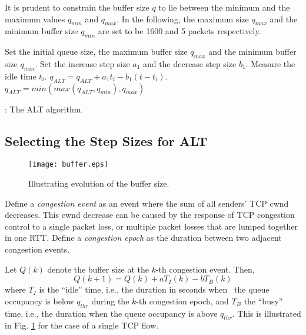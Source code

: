 \documentclass[10pt,twocolumn, journal]{IEEEtran}
\def\DLaddition#1{\noindent\ {\color{black} #1}}
\begin{document}
It is prudent to constrain the buffer size $q$ to lie between the minimum and the maximum values $q_{min}$ and $q_{max}$.  In the following, the maximum size $q_{max}$ and the minimum buffer size $q_{min}$ are set to be 1600 and 5 packets respectively.   


\begin{algorithm}[tb]
    \begin{algorithmic}[1]
        \STATE Set the initial queue size, the maximum buffer size $q_{max}$ and
            the minimum buffer size $q_{min}$.
        \STATE Set the increase step size $a_1$ and the decrease step size $b_1$.
            \STATE Measure the idle time $t_i$.
            \STATE $q_{ALT}=q_{ALT}+a_1t_i-b_1(t-t_i)$.
            \STATE $q_{ALT} = min(max(q_{ALT}, q_{min}), q_{max})$ 
       \ENDFOR
    \end{algorithmic}
    \caption{: The ALT algorithm.}
    \label{algo_alt}
\end{algorithm}



\subsection{Selecting the Step Sizes for ALT}\label{sec:analysis}

\begin{figure}[tb]
   \centering
   \texttt{[image: buffer.eps]}
   \caption{Illustrating evolution of the buffer size.}
   \label{fig_buffer}
\end{figure}

Define a \emph{congestion event} as an event where the sum of all senders' TCP cwnd decreases. This cwnd decrease can be caused by the response of TCP congestion control to a single packet loss, or multiple packet losses that are lumped together in one RTT. Define a \emph{congestion epoch} as the duration between two adjacent congestion events.

Let $Q(k)$ denote the buffer size at the $k$-th congestion event. Then,
\begin{equation}\label{eq:Q}
Q(k+1)=Q(k) + aT_I(k) - bT_B(k)
\end{equation}
where $T_I$ is the ``idle'' time, i.e., the duration in seconds when\DLaddition{the queue occupancy is below $q_{thr}$ 
during the $k$-th congestion epoch, and $T_B$ the ``busy'' time, i.e., the duration when
the queue occupancy is above $q_{thr}$.} This is illustrated in Fig. \ref{fig_buffer} for the case of a
single TCP flow.
\end{document}
